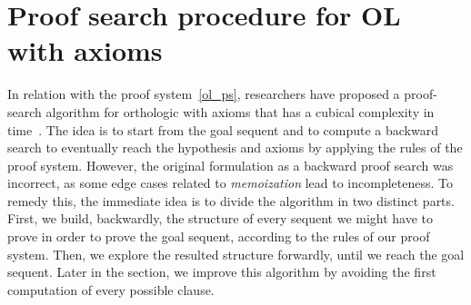 \documentclass[a4paper, 11pt]{article}
\newtheorem{example}[theorem]{Example}
\begin{document}
    \section{Proof search procedure for OL with axioms}
    In relation with the proof system~\ref{ol_ps}, researchers have proposed a proof-search algorithm 
    for orthologic with axioms that has a cubical complexity in time~\cite{10.1145/3632881}. The idea is
    to start from the goal sequent and to compute a backward search to eventually reach the hypothesis 
    and axioms by applying the rules of the proof system. However, the original formulation as a 
    backward proof search was incorrect, as some edge cases related to \textit{memoization} lead to 
    incompleteness.
    To remedy this, the immediate idea is to divide the algorithm in two distinct parts. First,
    we build, backwardly, the structure of every sequent we might have to prove in order to prove the 
    goal sequent, according to the rules of our proof system. Then, we explore the resulted structure
    forwardly, until we reach the goal sequent. Later in the section, we improve this algorithm by 
    avoiding the first computation of every possible clause.
\end{document}
